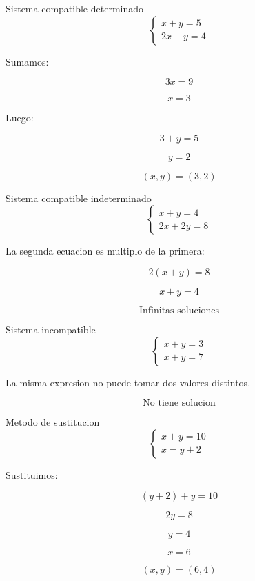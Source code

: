 \documentclass[aspectratio=169]{beamer}
\begin{document}
	\begin{frame}{Sistema compatible determinado}
		\[
		\begin{cases}
			x+y=5\\
			2x-y=4
		\end{cases}
		\]
		
		Sumamos:
		
		\[
		3x=9
		\]
		
		\[
		x=3
		\]
		
		Luego:
		
		\[
		3+y=5
		\]
		
		\[
		y=2
		\]
		
		\[
		\boxed{(x,y)=(3,2)}
		\]
	\end{frame}
	
	\begin{frame}{Sistema compatible indeterminado}
		\[
		\begin{cases}
			x+y=4\\
			2x+2y=8
		\end{cases}
		\]
		
		La segunda ecuacion es multiplo de la primera:
		
		\[
		2(x+y)=8
		\]
		
		\[
		x+y=4
		\]
		
		\[
		\boxed{\text{Infinitas soluciones}}
		\]
	\end{frame}
	
	\begin{frame}{Sistema incompatible}
		\[
		\begin{cases}
			x+y=3\\
			x+y=7
		\end{cases}
		\]
		
		La misma expresion no puede tomar dos valores distintos.
		
		\[
		\boxed{\text{No tiene solucion}}
		\]
	\end{frame}
	
	\begin{frame}{Metodo de sustitucion}
		\[
		\begin{cases}
			x+y=10\\
			x=y+2
		\end{cases}
		\]
		
		Sustituimos:
		
		\[
		(y+2)+y=10
		\]
		
		\[
		2y=8
		\]
		
		\[
		y=4
		\]
		
		\[
		x=6
		\]
		
		\[
		\boxed{(x,y)=(6,4)}
		\]
	\end{frame}
	
\end{document}
